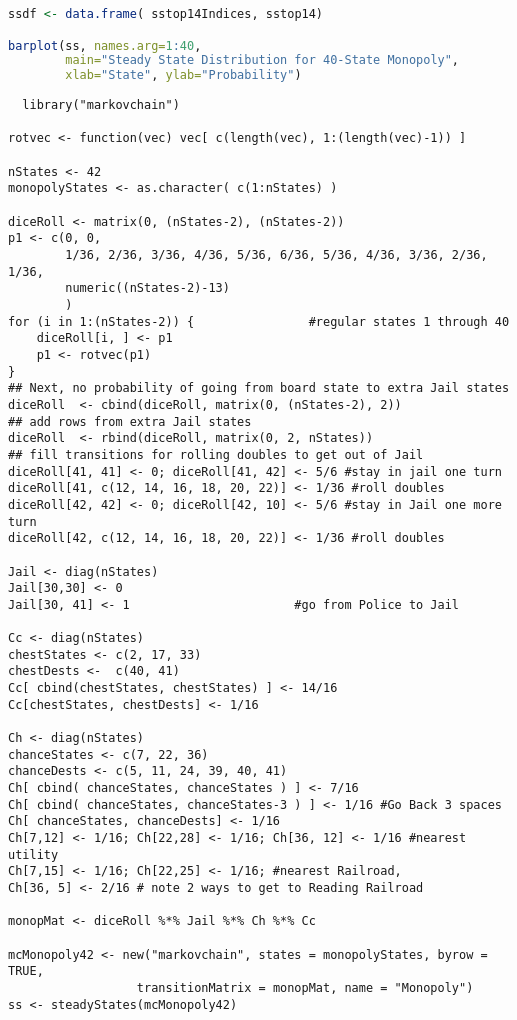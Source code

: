 \begin{description}
\begin{lstlisting}[language=R]
ssdf <- data.frame( sstop14Indices, sstop14)

barplot(ss, names.arg=1:40,
        main="Steady State Distribution for 40-State Monopoly",
        xlab="State", ylab="Probability")
\end{lstlisting}


\begin{lstlisting}
  library("markovchain")

rotvec <- function(vec) vec[ c(length(vec), 1:(length(vec)-1)) ]

nStates <- 42
monopolyStates <- as.character( c(1:nStates) )

diceRoll <- matrix(0, (nStates-2), (nStates-2))
p1 <- c(0, 0,
        1/36, 2/36, 3/36, 4/36, 5/36, 6/36, 5/36, 4/36, 3/36, 2/36, 1/36,
        numeric((nStates-2)-13)
        )
for (i in 1:(nStates-2)) {                #regular states 1 through 40
    diceRoll[i, ] <- p1
    p1 <- rotvec(p1)
}
## Next, no probability of going from board state to extra Jail states 
diceRoll  <- cbind(diceRoll, matrix(0, (nStates-2), 2))
## add rows from extra Jail states
diceRoll  <- rbind(diceRoll, matrix(0, 2, nStates))
## fill transitions for rolling doubles to get out of Jail
diceRoll[41, 41] <- 0; diceRoll[41, 42] <- 5/6 #stay in jail one turn
diceRoll[41, c(12, 14, 16, 18, 20, 22)] <- 1/36 #roll doubles
diceRoll[42, 42] <- 0; diceRoll[42, 10] <- 5/6 #stay in Jail one more turn
diceRoll[42, c(12, 14, 16, 18, 20, 22)] <- 1/36 #roll doubles 

Jail <- diag(nStates)
Jail[30,30] <- 0
Jail[30, 41] <- 1                       #go from Police to Jail

Cc <- diag(nStates)
chestStates <- c(2, 17, 33)
chestDests <-  c(40, 41)
Cc[ cbind(chestStates, chestStates) ] <- 14/16
Cc[chestStates, chestDests] <- 1/16

Ch <- diag(nStates)
chanceStates <- c(7, 22, 36)
chanceDests <- c(5, 11, 24, 39, 40, 41)
Ch[ cbind( chanceStates, chanceStates ) ] <- 7/16
Ch[ cbind( chanceStates, chanceStates-3 ) ] <- 1/16 #Go Back 3 spaces
Ch[ chanceStates, chanceDests] <- 1/16
Ch[7,12] <- 1/16; Ch[22,28] <- 1/16; Ch[36, 12] <- 1/16 #nearest utility
Ch[7,15] <- 1/16; Ch[22,25] <- 1/16; #nearest Railroad,
Ch[36, 5] <- 2/16 # note 2 ways to get to Reading Railroad

monopMat <- diceRoll %*% Jail %*% Ch %*% Cc

mcMonopoly42 <- new("markovchain", states = monopolyStates, byrow = TRUE,
                  transitionMatrix = monopMat, name = "Monopoly")
ss <- steadyStates(mcMonopoly42)


\end{lstlisting}
\end{description}
